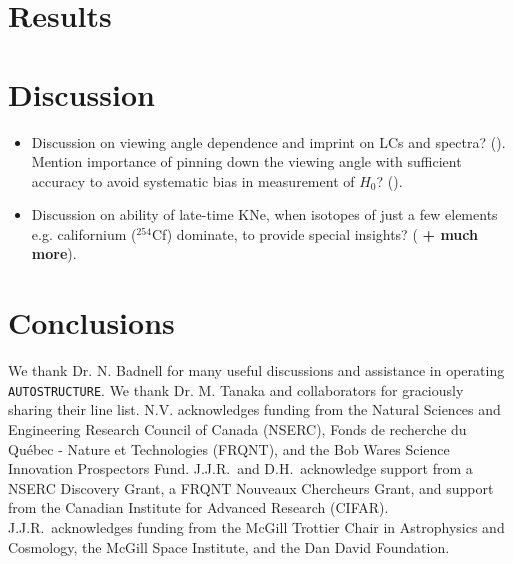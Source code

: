 \documentclass[twocolumn]{aastex63}
\begin{document}
\section{Results}\label{sec:results}


\section{Discussion}\label{sec:disco}
\begin{itemize}
    \item Discussion on viewing angle dependence and imprint on LCs and spectra? (\citealt{darbha20, korobkin20}). Mention importance of pinning down the viewing angle with sufficient accuracy to avoid systematic bias in measurement of $H_0$? (\citealt{chen20}).
    
    \item Discussion on ability of late-time KNe, when isotopes of just a few elements e.g. californium (${}^{254}$Cf) dominate, to provide special insights? (\citealt{villar18, wanajo18, zhu18, kasliwal19, wu19} \textbf{+ much more}). 
\end{itemize}

\section{Conclusions}\label{sec:conclusions}

\acknowledgments
We thank Dr. N. Badnell for many useful discussions and assistance in operating \texttt{AUTOSTRUCTURE}. We thank Dr. M. Tanaka and collaborators for graciously sharing their line list. N.V. acknowledges funding from the Natural Sciences and Engineering Research Council of Canada (NSERC), Fonds de recherche du Qu\'ebec - Nature et Technologies (FRQNT), and the Bob Wares Science Innovation Prospectors Fund. J.J.R.\ and D.H.\ acknowledge support from a NSERC Discovery Grant, a  FRQNT Nouveaux Chercheurs Grant, and support from the Canadian Institute for Advanced Research (CIFAR).  J.J.R.\ acknowledges funding from the McGill Trottier Chair in Astrophysics and Cosmology, the McGill Space Institute, and the Dan David Foundation.
\end{document}
